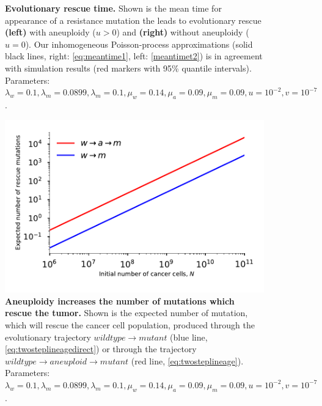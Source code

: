 \documentclass[12pt]{extarticle}
\begin{document}
\begin{appendices}
\begin{figure}[!htb]
\begin{subfigure}{0.5\textwidth}
\end{subfigure}
\caption{\textbf{Evolutionary rescue time.}
Shown is the mean time for appearance of a resistance mutation the leads to evolutionary rescue \textbf{(left)} with aneuploidy ($u>0$) and \textbf{(right)} without aneuploidy ($u=0$).
Our inhomogeneous Poisson-process approximations (solid black lines, right: \cref{eq:meantime1}, left: \cref{meantimet2}) is in agreement with simulation results (red markers with 95\% quantile intervals). 
Parameters: $\lambda_w=0.1,\lambda_m=0.0899,\lambda_m=0.1,\mu_w=0.14,\mu_a=0.09,\mu_m=0.09, u=10^{-2}, v=10^{-7}$.
}
\label{MeanTimeGrowthAneuploidyPlot} 
\end{figure}
\begin{figure}
\vspace*{1\baselineskip}
\includegraphics[width=1\textwidth]{Figures/ExpectedNumber.pdf}
\caption{\textbf{Aneuploidy increases the number of mutations which rescue the tumor.} Shown is the expected number of mutation, which will rescue the cancer cell population, produced through the evolutionary trajectory $wildtype \rightarrow mutant$ (blue line, \cref{eq:twosteplineagedirect}) or through the trajectory $wildtype \rightarrow aneuploid \rightarrow mutant$ (red line, \cref{eq:twosteplineage}).
Parameters: $\lambda_w=0.1,\lambda_m=0.0899,\lambda_m=0.1,\mu_w=0.14,\mu_a=0.09,\mu_m=0.09, u=10^{-2}, v=10^{-7}$.}
\label{ExpectedNumberRescueLineages}
\end{figure}

\end{appendices}

\end{document}
